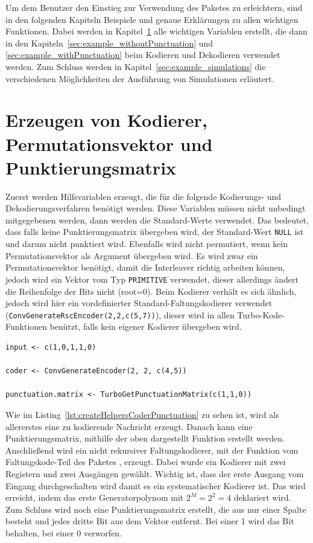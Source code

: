 Um dem Benutzer den Einstieg zur Verwendung des Paketes zu erleichtern, sind in den folgenden Kapiteln Beispiele und genaue Erklärungen zu allen wichtigen Funktionen. Dabei werden in Kapitel~\ref{sec:example_createHelpers} alle wichtigen Variablen erstellt, die dann in den Kapiteln~\ref{sec:example_withoutPunctuation} und \ref{sec:example_withPunctuation} beim Kodieren und Dekodieren verwendet werden. Zum Schluss werden in Kapitel~\ref{sec:example_simulations} die verschiedenen Möglichkeiten der Ausführung von Simulationen erläutert.

\section{Erzeugen von Kodierer, Permutationsvektor und Punktierungsmatrix}
\label{sec:example_createHelpers}
Zuerst werden Hilfsvariablen erzeugt, die für die folgende Kodierungs- und Dekodierungsverfahren benötigt werden. Diese Variablen müssen nicht unbedingt mitgegebenen werden, dann werden die Standard-Werte verwendet. Das bedeutet, dass falls keine Punktierungsmatrix übergeben wird, der Standard-Wert \texttt{NULL} ist und darum nicht punktiert wird. Ebenfalls wird nicht permutiert, wenn kein Permutationsvektor als Argument übergeben wird. Es wird zwar ein Permutationsvektor benötigt, damit die Interleaver richtig arbeiten können, jedoch wird ein Vektor vom Typ \texttt{PRIMITIVE} verwendet, dieser allerdings ändert die Reihenfolge der Bits nicht (root=0). Beim Kodierer verhält es sich ähnlich, jedoch wird hier ein vordefinierter Standard-Faltungskodierer verwendet (\texttt{ConvGenerateRscEncoder(2,2,c(5,7))}), dieser wird in allen Turbo-Kode-Funktionen benützt, falls kein eigener Kodierer übergeben wird.

\begin{lstlisting}[caption=Erzeugung von Kodierer und Punktierungsmatrix, label={lst:createHelpersCoderPunctuation}, float=!th]
input <- c(1,0,1,1,0)

coder <- ConvGenerateEncoder(2, 2, c(4,5))

punctuation.matrix <- TurboGetPunctuationMatrix(c(1,1,0))
\end{lstlisting}

Wie im Listing~\ref{lst:createHelpersCoderPunctuation} zu sehen ist, wird als allererstes eine zu kodierende Nachricht erzeugt. Danach kann eine Punktierungsmatrix, mithilfe der oben dargestellt Funktion erstellt werden. Anschließend wird ein nicht rekursiver Faltungskodierer, mit der Funktion vom Faltungskode-Teil des Paketes \cite{nocker}, erzeugt. Dabei wurde ein Kodierer mit zwei Registern und zwei Ausgängen gewählt. Wichtig ist, dass der erste Ausgang vom Eingang durchgeschalten wird damit es ein systematischer Kodierer ist. Das wird erreicht, indem das erste Generatorpolynom mit $2^M = 2^2 = 4$ deklariert wird. Zum Schluss wird noch eine Punktierungsmatrix erstellt, die aus nur einer Spalte besteht und jedes dritte Bit aus dem Vektor entfernt. Bei einer 1 wird das Bit behalten, bei einer 0 verworfen.

